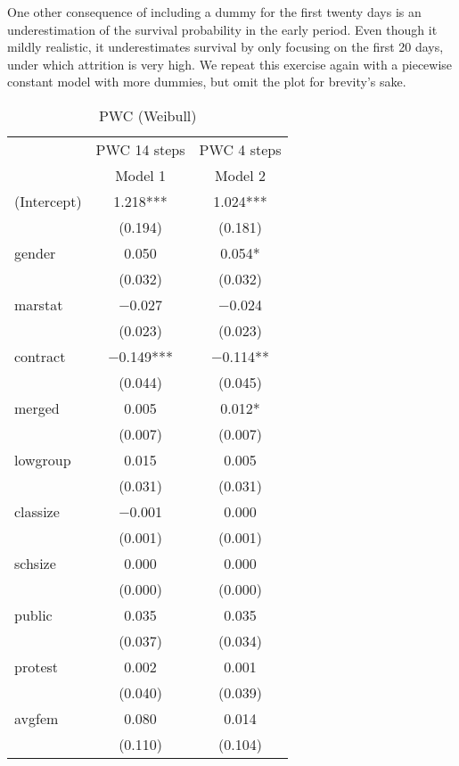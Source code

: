 \documentclass[
]{article}
\begin{document}
One other consequence of including a dummy for the first twenty days is
an underestimation of the survival probability in the early period. Even
though it mildly realistic, it underestimates survival by only focusing
on the first 20 days, under which attrition is very high. We repeat this
exercise again with a piecewise constant model with more dummies, but
omit the plot for brevity's sake.

\begin{table}[!h]

\caption{\label{tab:unnamed-chunk-17}PWC (Weibull)}
\centering
\fontsize{8}{10}\selectfont
\begin{tabular}[t]{lcc}
\toprule
\multicolumn{1}{c}{ } & \multicolumn{1}{c}{PWC 14 steps} & \multicolumn{1}{c}{PWC 4 steps} \\
\cmidrule(l{3pt}r{3pt}){2-2} \cmidrule(l{3pt}r{3pt}){3-3}
  & Model 1 & Model 2\\
\midrule
(Intercept) & \num{1.218}*** & \num{1.024}***\\
 & (\num{0.194}) & (\num{0.181})\\
gender & \num{0.050} & \num{0.054}*\\
 & (\num{0.032}) & (\num{0.032})\\
marstat & \num{-0.027} & \num{-0.024}\\
 & (\num{0.023}) & (\num{0.023})\\
contract & \num{-0.149}*** & \num{-0.114}**\\
 & (\num{0.044}) & (\num{0.045})\\
merged & \num{0.005} & \num{0.012}*\\
 & (\num{0.007}) & (\num{0.007})\\
lowgroup & \num{0.015} & \num{0.005}\\
 & (\num{0.031}) & (\num{0.031})\\
classize & \num{-0.001} & \num{0.000}\\
 & (\num{0.001}) & (\num{0.001})\\
schsize & \num{0.000} & \num{0.000}\\
 & (\num{0.000}) & (\num{0.000})\\
public & \num{0.035} & \num{0.035}\\
 & (\num{0.037}) & (\num{0.034})\\
protest & \num{0.002} & \num{0.001}\\
 & (\num{0.040}) & (\num{0.039})\\
avgfem & \num{0.080} & \num{0.014}\\
 & (\num{0.110}) & (\num{0.104})\\

\end{tabular}
\end{table}
\end{document}
